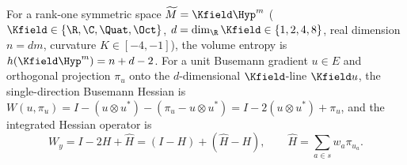 \begin{definition}
\label{def_rank_one_invariants}
\leanok
{}
For a rank-one symmetric space $\widetilde{M} = \Kfield\Hyp^m$ ($\Kfield \in \{\R, \C, \Quat, \Oct\}$, $d = \dim_\R \Kfield \in \{1, 2, 4, 8\}$, real dimension $n = d m$, curvature $K \in [-4, -1]$), the volume entropy is $h(\Kfield\Hyp^m) = n + d - 2$. For a unit Busemann gradient $u \in E$ and orthogonal projection $\pi_u$ onto the $d$-dimensional $\Kfield$-line $\Kfield u$, the single-direction Busemann Hessian is $W(u, \pi_u) = I - (u \otimes u^*) - (\pi_u - u \otimes u^*) = I - 2(u \otimes u^*) + \pi_u$, and the integrated Hessian operator is
$$W_y = I - 2H + \widehat{H} = (I - H) + (\widehat{H} - H), \qquad \widehat{H} = \sum_{a \in s} w_a \pi_{u_a}.$$
\end{definition}

